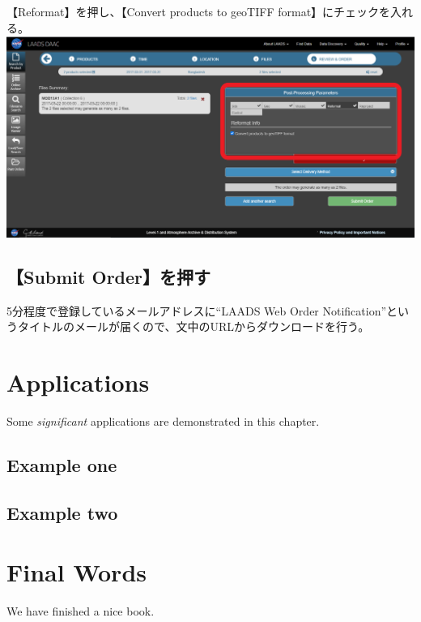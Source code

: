 \documentclass[
]{book}
\begin{document}
【Reformat】を押し、【Convert products to geoTIFF format】にチェックを入れる。
\includegraphics{images/LD-7.png}

\hypertarget{submit-orderux3092ux62bcux3059}{%
\section{【Submit Order】を押す}\label{submit-orderux3092ux62bcux3059}}

5分程度で登録しているメールアドレスに``LAADS Web Order Notification''というタイトルのメールが届くので、文中のURLからダウンロードを行う。

\hypertarget{applications}{%
\chapter{Applications}\label{applications}}

Some \emph{significant} applications are demonstrated in this chapter.

\hypertarget{example-one}{%
\section{Example one}\label{example-one}}

\hypertarget{example-two}{%
\section{Example two}\label{example-two}}

\hypertarget{final-words}{%
\chapter{Final Words}\label{final-words}}

We have finished a nice book.

  
\end{document}
